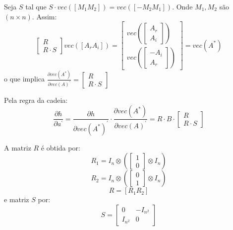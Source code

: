 \documentclass[a4paper,10pt]{article}
\begin{document}
Seja $S$ tal que $S \cdot vec([M_{1} M_{2}]) = vec([-M_{2} M_{1}])$. Onde $M_{1}, M_{2}$ são $(n \times n)$. Assim:
\begin{equation}
\left[ \begin{array}{c}
 R \\ R \cdot S
\end{array} \right] vec([A_{r} A_{i}]) = \left[ \begin{array}{c}
 vec(\left[ \begin{array}{c}
 A_{r} \\ A_{i}
\end{array} \right]
) \\ vec(\left[ \begin{array}{c}
 -A_{i} \\ A_{r}
\end{array} \right]
)
\end{array} \right] = vec(A^{\ast})
\end{equation}
o que implica $\frac{\partial vec(A^{\ast})}{\partial vec(A)^{'}} = \left[ \begin{array}{c}
 R \\ R \cdot S
\end{array} \right]$

Pela regra da cadeia:
\begin{equation}
\frac{\partial h}{\partial a^{'}} = \frac{\partial h}{\partial vec(A^{\ast})^{'}} \cdot \frac{\partial vec(A^{\ast})}{\partial vec(A)^{'}} = 
R \cdot B \cdot \left[ \begin{array}{c}
 R \\ R \cdot S
\end{array} \right]
\end{equation}

A matriz $R$ é obtida por:
\begin{equation}
R_{1} = I_{n} \otimes (\left[ \begin{array}{c} 1 \\ 0 \end{array} \right] \otimes I_{n})
\end{equation}
\begin{equation}
R_{2} = I_{n} \otimes (\left[ \begin{array}{c} 0 \\ 1 \end{array} \right] \otimes I_{n})
\end{equation}
\begin{equation}
R = [R_{1} R_{2}]
\end{equation}
e matriz $S$ por:
\begin{equation}
S = \left[ \begin{array}{cc}
 0 & -I_{n^{2}} \\
I_{n^{2}} & 0
\end{array} \right]
\end{equation}
\end{document}
